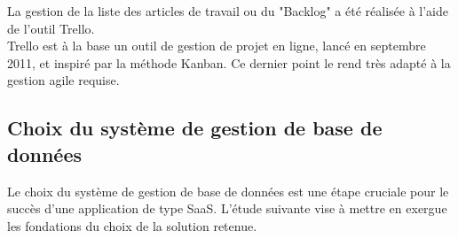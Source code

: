 \begin{spacing}{1.5}
La gestion de la liste des articles de travail ou du "Backlog" a été réalisée à l'aide de l'outil Trello.\\
Trello est à la base un outil de gestion de projet en ligne, lancé en septembre 2011, et inspiré par la méthode Kanban. Ce dernier point le rend très adapté à la gestion agile requise.

\subsection{Choix du système de gestion de base de données}
Le choix du système de gestion de base de données est une étape cruciale pour le succès d'une application de type SaaS. L'étude suivante vise à mettre en exergue les fondations du choix de la solution retenue.\\


\end{spacing}
